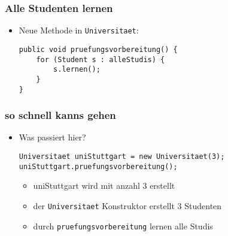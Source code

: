 \documentclass{../../presentation}
\begin{document}
\begin{frame}[fragile]
	\frametitle{Alle Studenten lernen}

	\begin{itemize}
		\item<2-> Neue Methode in \texttt{Universitaet}:
		      \begin{verbatim}
public void pruefungsvorbereitung() {
	for (Student s : alleStudis) {
		s.lernen();
	}
}
\end{verbatim}
	\end{itemize}
\end{frame}
\begin{frame}[fragile]
	\frametitle{so schnell kanns gehen}

	\begin{itemize}
		\item<2-> Was passiert hier?
		      \begin{verbatim}
Universitaet uniStuttgart = new Universitaet(3);
uniStuttgart.pruefungsvorbereitung();
\end{verbatim}
		      \begin{itemize}
			      \item<3->[\textbullet]uniStuttgart wird mit anzahl 3 erstellt
			      \item<4->[\textbullet]der \texttt{Universitaet} Konstruktor erstellt 3 Studenten
			      \item<5->[\textbullet]durch \texttt{pruefungsvorbereitung} lernen alle Studis
		      \end{itemize}
	\end{itemize}
\end{frame}

\renewcommand{\feedbackurl}{https://forms.gle/JasKFVgR2ARoFVTEA}

\end{document}
